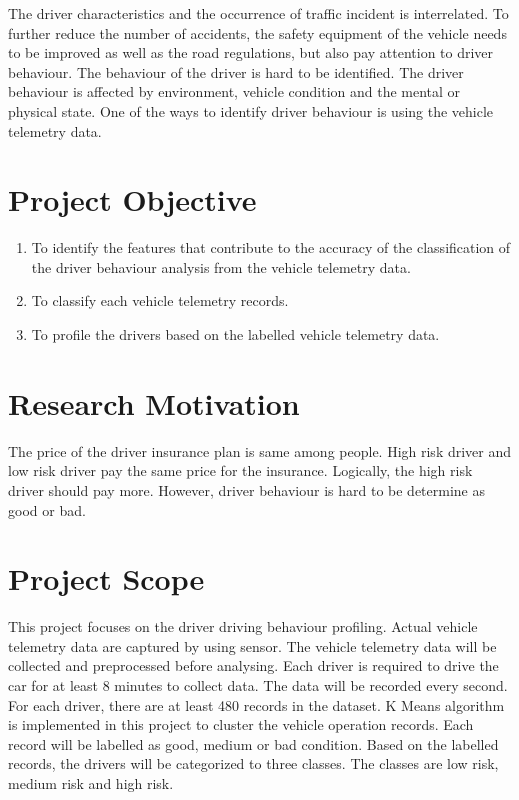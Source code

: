 The driver characteristics and the occurrence of traffic incident is interrelated. To further reduce the number of accidents, the safety equipment of the vehicle needs to be improved as well as the road regulations, but also pay attention to driver behaviour. The behaviour of the driver is hard to be identified. The driver behaviour is affected by environment, vehicle condition and the mental or physical state. One of the ways to identify driver behaviour is using the vehicle telemetry data.

\section{Project Objective}
\begin{enumerate}
\item To identify the features that contribute to the accuracy of the classification of the driver behaviour analysis from the vehicle telemetry data.
\item To classify each vehicle telemetry records.
\item To profile the drivers based on the labelled vehicle telemetry data.
\end{enumerate}

\section{Research Motivation}
The price of the driver insurance plan is same among people. High risk driver and low risk driver pay the same price for the insurance. Logically, the high risk driver should pay more. However, driver behaviour is hard to be determine as good or bad. 

\section{Project Scope}
This project focuses on the driver driving behaviour profiling. Actual vehicle telemetry data are captured by using sensor. The vehicle telemetry data will be collected and preprocessed before analysing. Each driver is required to drive the car for at least 8 minutes to collect data. The data will be recorded every second. For each driver, there are at least 480 records in the dataset. K Means algorithm is implemented in this project to cluster the vehicle operation records. Each record will be labelled as good, medium or bad condition. Based on the labelled records, the drivers will be categorized to three classes. The classes are low risk, medium risk and high risk. 

